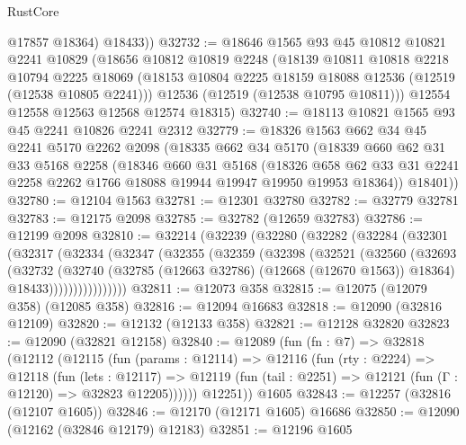 \begin{lexlean}{RustCore}
\begin{coremodule}
          @17857
          @18364)
        @18433))
@32732 := @18646
    @1565
    @93
    @45
    @10812
    @10821
    @2241
    @10829
    (@18656
      @10812
      @10819
      @2248
      (@18139
        @10811
        @10818
        @2218
        @10794
        @2225
        @18069
        (@18153 @10804 @2225 @18159 @18088 @12536 (@12519 (@12538 @10805 @2241)))
        @12536
        (@12519 (@12538 @10795 @10811)))
      @12554
      @12558
      @12563
      @12568
      @12574
      @18315)
@32740 := @18113 @10821 @1565 @93 @45 @2241 @10826 @2241 @2312
@32779 := @18326
    @1563
    @662
    @34
    @45
    @2241
    @5170
    @2262
    @2098
    (@18335
      @662
      @34
      @5170
      (@18339
        @660
        @62
        @31
        @33
        @5168
        @2258
        (@18346
          @660
          @31
          @5168
          (@18326
            @658
            @62
            @33
            @31
            @2241
            @2258
            @2262
            @1766
            @18088
            @19944
            @19947
            @19950
            @19953
            @18364))
        @18401))
@32780 := @12104 @1563
@32781 := @12301 @32780
@32782 := @32779 @32781
@32783 := @12175 @2098
@32785 := @32782 (@12659 @32783)
@32786 := @12199 @2098
@32810 := @32214
    (@32239
      (@32280
        (@32282
          (@32284
            (@32301
              (@32317
                (@32334
                  (@32347
                    (@32355
                      (@32359
                        (@32398
                          (@32521
                            (@32560
                              (@32693
                                (@32732
                                  (@32740
                                    (@32785 (@12663 @32786) (@12668 (@12670 @1563)) @18364)
                                    @18433))))))))))))))))
@32811 := @12073 @358
@32815 := @12075 (@12079 @358) (@12085 @358)
@32816 := @12094 @16683
@32818 := @12090 (@32816 @12109)
@32820 := @12132 (@12133 @358)
@32821 := @12128 @32820
@32823 := @12090 (@32821 @12158)
@32840 := @12089
    (fun (fn : @7) =>
    @32818
      (@12112
        (@12115
          (fun (params : @12114) =>
          @12116
            (fun (rty : @2224) =>
            @12118
              (fun (lets : @12117) =>
              @12119 (fun (tail : @2251) => @12121 (fun (Γ : @12120) => @32823 @12205))))))
        @12251))
    @1605
@32843 := @12257 (@32816 (@12107 @1605))
@32846 := @12170 (@12171 @1605) @16686
@32850 := @12090 (@12162 (@32846 @12179) @12183)
@32851 := @12196 @1605

\end{coremodule}
\end{lexlean}

